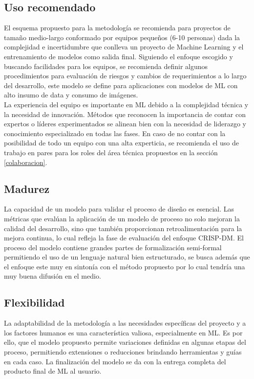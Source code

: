 \documentclass[journal]{IEEEtran}
\begin{document}
\subsection{Uso recomendado}

El esquema propuesto para la metodología se recomienda para proyectos de tamaño medio-largo conformado por equipos pequeños (6-10 personas) dada la complejidad e incertidumbre que conlleva un proyecto de Machine Learning y el entrenamiento de modelos como salida final. Siguiendo el enfoque escogido y buscando facilidades para los equipos, se recomienda definir algunos procedimientos para evaluación de riesgos y cambios de requerimientos a lo largo del desarrollo, este modelo se define para aplicaciones con modelos de ML con alto insumo de data y consumo de imágenes.\\

La experiencia del equipo es importante en ML debido a la complejidad técnica y la necesidad de innovación. Métodos que reconocen la importancia de contar con expertos o líderes experimentados se alinean bien con la necesidad de liderazgo y conocimiento especializado en todas las fases. En caso de no contar con la posibilidad de todo un equipo con una alta experticia, se recomienda el uso de trabajo en pares para los roles del área técnica propuestos en la sección \ref{colaboracion}.\\

\subsection{Madurez}

La capacidad de un modelo para validar el proceso de diseño es esencial. Las métricas que evalúan la aplicación de un modelo de proceso no solo mejoran la calidad del desarrollo, sino que también proporcionan retroalimentación para la mejora continua, lo cual refleja la fase de evaluación del enfoque CRISP-DM. El proceso del modelo contiene grandes partes de formalización semi-formal permitiendo el uso de un lenguaje natural bien estructurado, se busca además que el enfoque este muy en sintonía con el método propuesto por lo cual tendría una muy buena difusión en el medio.\\

\subsection{Flexibilidad}

La adaptabilidad de la metodología a las necesidades específicas del proyecto y a los factores humanos es una característica valiosa, especialmente en ML. Es por ello, que el modelo propuesto permite variaciones definidas en algunas etapas del proceso, permitiendo extensiones o reducciones brindando herramientas y guías en cada caso. La finalización del modelo se da con la entrega completa del producto final de ML al usuario.\\
\end{document}
